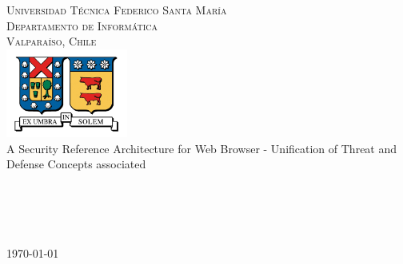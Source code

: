 \begin{titlepage}

\begin{center}

\textsc{\Large Universidad Técnica Federico Santa María}\\
\textsc{\large Departamento de Informática}\\
\textsc{\large Valparaíso, Chile}\\[1.5cm]

\includegraphics[width=0.3\textwidth]{figures/utfsm.jpg}\\[1cm]    

{ \huge A Security Reference Architecture for Web Browser - Unification of Threat and Defense Concepts associated}\\[2cm]

\\[2cm]
\\
\\[3cm]
\\

\vfill

{\large \today}

\end{center}

\end{titlepage}
